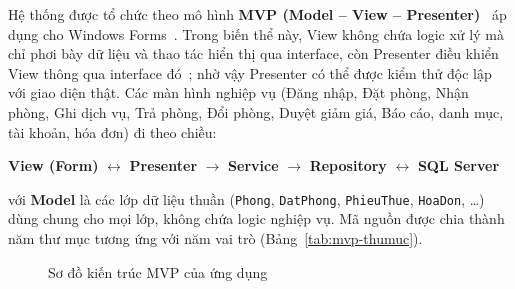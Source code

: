 \documentclass[14pt]{report}
\begin{document}
Hệ thống được tổ chức theo mô hình \textbf{MVP (Model -- View -- Presenter)}~\cite{potel} áp dụng cho Windows Forms~\cite{ms-winforms}. Trong biến thể này, View không chứa logic xử lý mà chỉ phơi bày dữ liệu và thao tác hiển thị qua interface, còn Presenter điều khiển View thông qua interface đó~\cite{fowler}; nhờ vậy Presenter có thể được kiểm thử độc lập với giao diện thật. Các màn hình nghiệp vụ (Đăng nhập, Đặt phòng, Nhận phòng, Ghi dịch vụ, Trả phòng, Đổi phòng, Duyệt giảm giá, Báo cáo, danh mục, tài khoản, hóa đơn) đi theo chiều:

\begin{center}
\textbf{View (Form)} $\longleftrightarrow$ \textbf{Presenter} $\longrightarrow$ \textbf{Service} $\longrightarrow$ \textbf{Repository} $\longleftrightarrow$ \textbf{SQL Server}
\end{center}

với \textbf{Model} là các lớp dữ liệu thuần (\texttt{Phong}, \texttt{DatPhong}, \texttt{PhieuThue}, \texttt{HoaDon}, \dots) dùng chung cho mọi lớp, không chứa logic nghiệp vụ. Mã nguồn được chia thành năm thư mục tương ứng với năm vai trò (Bảng~\ref{tab:mvp-thumuc}).

\begin{figure}[H]
\centering
{}
\caption{Sơ đồ kiến trúc MVP của ứng dụng}
\label{fig:mvp}
\end{figure}
\end{document}

